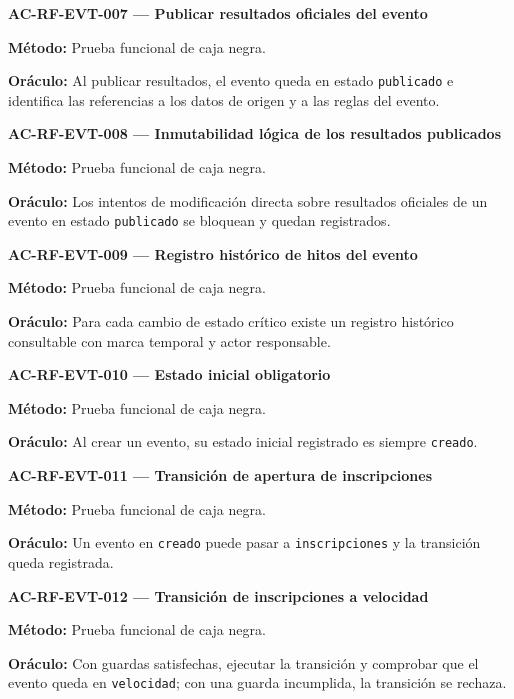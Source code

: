 \documentclass[10pt,letterpaper]{article}
\begin{document}
\noindent\textbf{AC-RF-EVT-007 --- Publicar resultados oficiales del evento}\par
\textbf{Método:} Prueba funcional de caja negra.\par
\textbf{Oráculo:} Al publicar resultados, el evento queda en estado \texttt{publicado} e identifica las referencias a los datos de origen y a las reglas del evento.\par\vspace{0.45em}
\noindent\textbf{AC-RF-EVT-008 --- Inmutabilidad lógica de los resultados publicados}\par
\textbf{Método:} Prueba funcional de caja negra.\par
\textbf{Oráculo:} Los intentos de modificación directa sobre resultados oficiales de un evento en estado \texttt{publicado} se bloquean y quedan registrados.\par\vspace{0.45em}
\noindent\textbf{AC-RF-EVT-009 --- Registro histórico de hitos del evento}\par
\textbf{Método:} Prueba funcional de caja negra.\par
\textbf{Oráculo:} Para cada cambio de estado crítico existe un registro histórico consultable con marca temporal y actor responsable.\par\vspace{0.45em}
\noindent\textbf{AC-RF-EVT-010 --- Estado inicial obligatorio}\par
\textbf{Método:} Prueba funcional de caja negra.\par
\textbf{Oráculo:} Al crear un evento, su estado inicial registrado es siempre \texttt{creado}.\par\vspace{0.45em}
\noindent\textbf{AC-RF-EVT-011 --- Transición de apertura de inscripciones}\par
\textbf{Método:} Prueba funcional de caja negra.\par
\textbf{Oráculo:} Un evento en \texttt{creado} puede pasar a \texttt{inscripciones} y la transición queda registrada.\par\vspace{0.45em}
\noindent\textbf{AC-RF-EVT-012 --- Transición de inscripciones a velocidad}\par
\textbf{Método:} Prueba funcional de caja negra.\par
\textbf{Oráculo:} Con guardas satisfechas, ejecutar la transición y comprobar que el evento queda en \texttt{velocidad}; con una guarda incumplida, la transición se rechaza.\par\vspace{0.45em}
\end{document}
